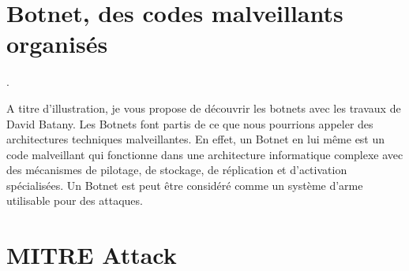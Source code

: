 \section{Botnet, des codes malveillants organisés}.

A titre d'illustration, je vous propose de découvrir les botnets avec les travaux de David Batany.
Les Botnets font partis de ce que nous pourrions appeler des architectures techniques malveillantes. En effet, un Botnet en lui même est un code malveillant qui fonctionne dans une architecture informatique complexe avec des mécanismes de pilotage, de stockage, de réplication et d'activation spécialisées. Un Botnet est peut être considéré comme un système d'arme utilisable pour des attaques.

\section{MITRE Attack}

\utocomplete

%




